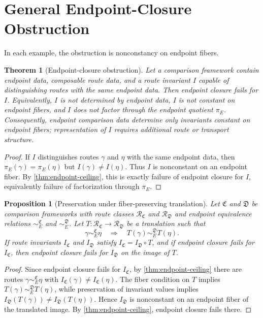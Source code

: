 \documentclass[12pt]{article}
\newtheorem{theorem}{Theorem}[section]
\newtheorem{proposition}[proposition]{Proposition}
\newcommand{\calR}{\mathcal{R}}
\begin{document}
\section{General Endpoint-Closure Obstruction}
\label{sec:thesis}

In each example, the obstruction is nonconstancy on endpoint fibers.

\begin{theorem}[Endpoint-closure obstruction]
\label{thm:general-extension}
Let a comparison framework contain endpoint data, composable route data,
and a route invariant $I$ capable of distinguishing routes with the same
endpoint data. Then endpoint closure fails for $I$. Equivalently, $I$ is
not determined by endpoint data, $I$ is not constant on endpoint fibers,
and $I$ does not factor through the endpoint quotient $\pi_E$.
Consequently, endpoint comparison data determine only invariants constant
on endpoint fibers; representation of $I$ requires additional route or
transport structure.
\end{theorem}

\begin{proof}
If $I$ distinguishes routes $\gamma$ and $\eta$ with the same endpoint
data, then $\pi_E(\gamma)=\pi_E(\eta)$ but $I(\gamma)\neq I(\eta)$. Thus
$I$ is nonconstant on an endpoint fiber. By
\cref{thm:endpoint-ceiling}, this is exactly failure of endpoint closure
for $I$, equivalently failure of factorization through $\pi_E$.
\end{proof}

\begin{proposition}[Preservation under fiber-preserving translation]
\label{prop:structural-universality}
Let $\mathfrak C$ and $\mathfrak D$ be comparison frameworks with route
classes $\calR_{\mathfrak C}$ and $\calR_{\mathfrak D}$ and endpoint
equivalence relations $\sim_E^{\mathfrak C}$ and $\sim_E^{\mathfrak D}$.
Let $T:\calR_{\mathfrak C}\to\calR_{\mathfrak D}$ be a translation such
that
\[
  \gamma\sim_E^{\mathfrak C}\eta
  \quad\Longrightarrow\quad
  T(\gamma)\sim_E^{\mathfrak D}T(\eta).
\]
If route invariants $I_{\mathfrak C}$ and $I_{\mathfrak D}$ satisfy
$I_{\mathfrak C}=I_{\mathfrak D}\circ T$, and if endpoint closure fails
for $I_{\mathfrak C}$, then endpoint closure fails for
$I_{\mathfrak D}$ on the image of $T$.
\end{proposition}

\begin{proof}
Since endpoint closure fails for $I_{\mathfrak C}$, by
\cref{thm:endpoint-ceiling} there are routes
$\gamma\sim_E^{\mathfrak C}\eta$ with
$I_{\mathfrak C}(\gamma)\neq I_{\mathfrak C}(\eta)$. The fiber condition
on $T$ implies $T(\gamma)\sim_E^{\mathfrak D}T(\eta)$, while preservation
of invariant values implies
$I_{\mathfrak D}(T(\gamma))\neq I_{\mathfrak D}(T(\eta))$. Hence
$I_{\mathfrak D}$ is nonconstant on an endpoint fiber of the translated
image. By \cref{thm:endpoint-ceiling}, endpoint closure fails there.
\end{proof}
\end{document}
